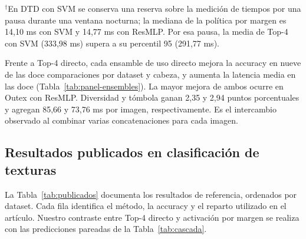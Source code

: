 \documentclass[a4paper,fleqn]{cas-sc}
\begin{document}
\begin{table}[pos=htbp]
\vspace{0.35em}
\begin{minipage}{0.98\textwidth}\footnotesize
$^{\dagger}$En DTD con SVM se conserva una reserva sobre la medición de tiempos por una pausa durante una ventana nocturna; la mediana de la política por margen es 14,10 ms con SVM y 14,77 ms con ResMLP. Por esa pausa, la media de Top-4 con SVM (333,98 ms) supera a su percentil 95 (291,77 ms).
\end{minipage}
\end{table}

Frente a Top-4 directo, cada ensamble de uso directo mejora la accuracy en nueve de las doce comparaciones por dataset y cabeza, y aumenta la latencia media en las doce (Tabla~\ref{tab:panel-ensembles}). La mayor mejora de ambos ocurre en Outex con ResMLP. Diversidad y tómbola ganan 2,35 y 2,94 puntos porcentuales y agregan 85,66 y 73,76 ms por imagen, respectivamente. Es el intercambio observado al combinar varias concatenaciones para cada imagen.

\FloatBarrier
\subsection{Resultados publicados en clasificación de texturas}

La Tabla~\ref{tab:publicados} documenta los resultados de referencia, ordenados por dataset. Cada fila identifica el método, la accuracy y el reparto utilizado en el artículo. Nuestro contraste entre Top-4 directo y activación por margen se realiza con las predicciones pareadas de la Tabla~\ref{tab:cascada}.
\end{document}
